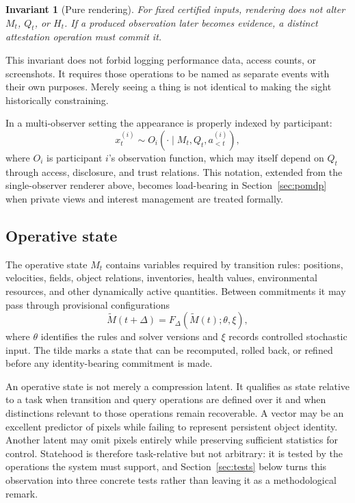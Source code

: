 \documentclass[11pt]{article}
\newtheorem{invariant}{Invariant}
\begin{document}
\begin{invariant}[Pure rendering]
\label{inv:pure-rendering}
For fixed certified inputs, rendering does not alter $M_t$, $Q_t$, or $H_t$. If a produced observation later becomes evidence, a distinct attestation operation must commit it.
\end{invariant}

This invariant does not forbid logging performance data, access counts, or screenshots. It requires those operations to be named as separate events with their own purposes. Merely seeing a thing is not identical to making the sight historically constraining.

In a multi-observer setting the appearance is properly indexed by participant:
\[
x_t^{(i)} \sim O_i(\cdot \mid M_t, Q_t, a^{(i)}_{<t}),
\]
where $O_i$ is participant $i$'s observation function, which may itself depend on $Q_t$ through access, disclosure, and trust relations. This notation, extended from the single-observer renderer above, becomes load-bearing in Section~\ref{sec:pomdp} when private views and interest management are treated formally.

\subsection{Operative state}
\label{sec:operative-state}

The operative state $M_t$ contains variables required by transition rules: positions, velocities, fields, object relations, inventories, health values, environmental resources, and other dynamically active quantities. Between commitments it may pass through provisional configurations
\[
\tilde{M}(t+\Delta) = F_\Delta(\tilde{M}(t); \theta, \xi),
\]
where $\theta$ identifies the rules and solver versions and $\xi$ records controlled stochastic input. The tilde marks a state that can be recomputed, rolled back, or refined before any identity-bearing commitment is made.

An operative state is not merely a compression latent. It qualifies as state relative to a task when transition and query operations are defined over it and when distinctions relevant to those operations remain recoverable. A vector may be an excellent predictor of pixels while failing to represent persistent object identity. Another latent may omit pixels entirely while preserving sufficient statistics for control. Statehood is therefore task-relative but not arbitrary: it is tested by the operations the system must support, and Section~\ref{sec:tests} below turns this observation into three concrete tests rather than leaving it as a methodological remark.
\end{document}
